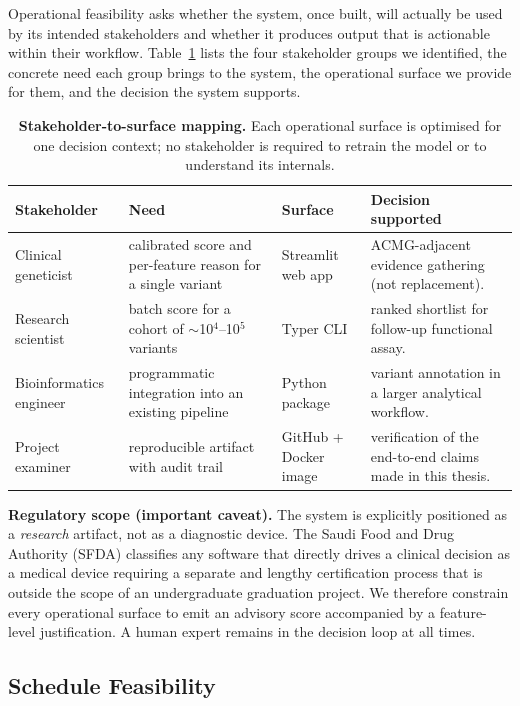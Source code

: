 \documentclass[11pt,a4paper,oneside]{report}
\begin{document}
Operational feasibility asks whether the system, once built,
will actually be used by its intended stakeholders and
whether it produces output that is actionable within their
workflow. Table~\ref{tab:stakeholders} lists the four
stakeholder groups we identified, the concrete need each
group brings to the system, the operational surface we
provide for them, and the decision the system supports.

\begin{table}[htbp]
\centering
\footnotesize
\begin{tabularx}{\linewidth}{@{}l X X X@{}}
\toprule
\textbf{Stakeholder} & \textbf{Need} & \textbf{Surface} & \textbf{Decision supported} \\
\midrule
Clinical geneticist &
calibrated score and per-feature reason for a single variant &
Streamlit web app &
ACMG-adjacent evidence gathering (not replacement). \\
Research scientist &
batch score for a cohort of $\sim$10$^4$--10$^5$ variants &
Typer CLI &
ranked shortlist for follow-up functional assay. \\
Bioinformatics engineer &
programmatic integration into an existing pipeline &
Python package &
variant annotation in a larger analytical workflow. \\
Project examiner &
reproducible artifact with audit trail &
GitHub + Docker image &
verification of the end-to-end claims made in this thesis. \\
\bottomrule
\end{tabularx}
\caption[Stakeholder-to-surface mapping]{\textbf{Stakeholder-to-surface
mapping.} Each operational surface is optimised for one
decision context; no stakeholder is required to retrain the
model or to understand its internals.}
\label{tab:stakeholders}
\end{table}

\textbf{Regulatory scope (important caveat).} The system is
explicitly positioned as a \emph{research} artifact, not as
a diagnostic device. The Saudi Food and Drug Authority
(SFDA) classifies any software that directly drives a
clinical decision as a medical device requiring a separate
and lengthy certification process that is outside the scope
of an undergraduate graduation project. We therefore
constrain every operational surface to emit an advisory
score accompanied by a feature-level justification. A human
expert remains in the decision loop at all times.

\subsection{Schedule Feasibility}
\label{sec:feas-sched}
\end{document}
